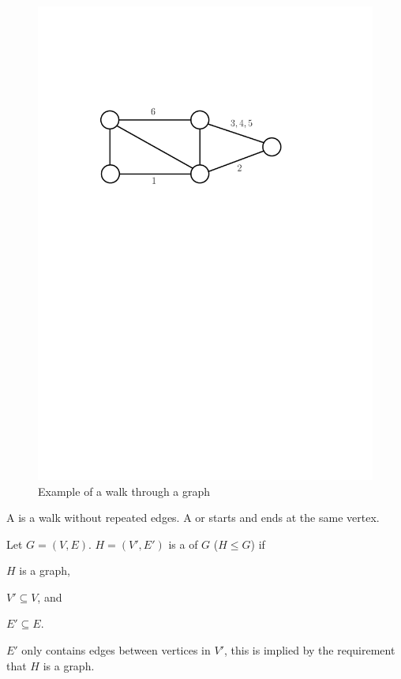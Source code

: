 \begin{figure}[htb]
\centering
\includegraphics[scale=.5]{01_graph_theory/pics/walk.pdf}
\caption{Example of a walk through a graph}
\end{figure}
\FloatBarrier

\begin{definition}
A  is a walk without repeated edges. A  or
 starts and ends at the same vertex.
\end{definition}

\begin{definition}
Let $G=(V,E)$. $H=(V',E')$ is a  of $G$ ($H \leq G$) if
\begin{compactitem}
\item $H$ is a graph,
\item $V' \subseteq V$, and
\item $E' \subseteq E$.
\end{compactitem}
$E'$ only contains edges between vertices in $V'$, this is implied by the requirement that $H$ is a graph.
\end{definition}

